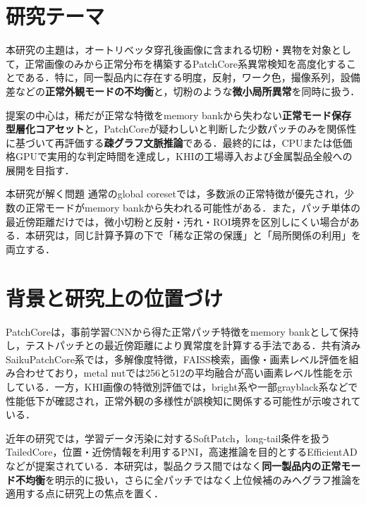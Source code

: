 \documentclass[a4paper,11pt]{ltjsarticle}
\begin{document}

\section{研究テーマ}
本研究の主題は，オートリベッタ穿孔後画像に含まれる切粉・異物を対象として，正常画像のみから正常分布を構築するPatchCore系異常検知を高度化することである．特に，同一製品内に存在する明度，反射，ワーク色，撮像系列，設備差などの\textbf{正常外観モードの不均衡}と，切粉のような\textbf{微小局所異常}を同時に扱う．

提案の中心は，稀だが正常な特徴をmemory bankから失わない\textbf{正常モード保存型層化コアセット}と，PatchCoreが疑わしいと判断した少数パッチのみを関係性に基づいて再評価する\textbf{疎グラフ文脈推論}である．最終的には，CPUまたは低価格GPUで実用的な判定時間を達成し，KHIの工場導入および金属製品全般への展開を目指す．

\begin{KhiBox}{本研究が解く問題}
通常のglobal coresetでは，多数派の正常特徴が優先され，少数の正常モードがmemory bankから失われる可能性がある．また，パッチ単体の最近傍距離だけでは，微小切粉と反射・汚れ・ROI境界を区別しにくい場合がある．本研究は，同じ計算予算の下で「稀な正常の保護」と「局所関係の利用」を両立する．
\end{KhiBox}

\section{背景と研究上の位置づけ}
PatchCoreは，事前学習CNNから得た正常パッチ特徴をmemory bankとして保持し，テストパッチとの最近傍距離により異常度を計算する手法である．共有済みSaikuPatchCore系では，多解像度特徴，FAISS検索，画像・画素レベル評価を組み合わせており，metal nutでは256と512の平均融合が高い画素レベル性能を示している．一方，KHI画像の特徴別評価では，bright系や一部grayblack系などで性能低下が確認され，正常外観の多様性が誤検知に関係する可能性が示唆されている．

近年の研究では，学習データ汚染に対するSoftPatch，long-tail条件を扱うTailedCore，位置・近傍情報を利用するPNI，高速推論を目的とするEfficientADなどが提案されている．本研究は，製品クラス間ではなく\textbf{同一製品内の正常モード不均衡}を明示的に扱い，さらに全パッチではなく上位候補のみへグラフ推論を適用する点に研究上の焦点を置く．
\end{document}
